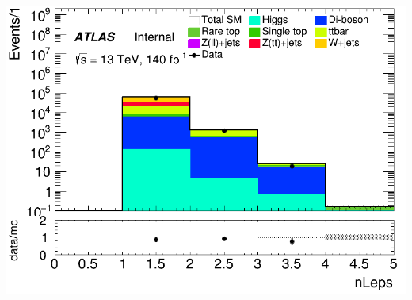 \documentclass[usenames,dvipsnames]{beamer}
\begin{document}
\begin{frame}
\begin{minipage}{0.32\textwidth}
        \includegraphics[width=\textwidth]{graphics/LH_met/LH_met_nLeps.png}
    \end{minipage}
    
    \vspace{0.5cm} %


\end{frame}
\end{document}

